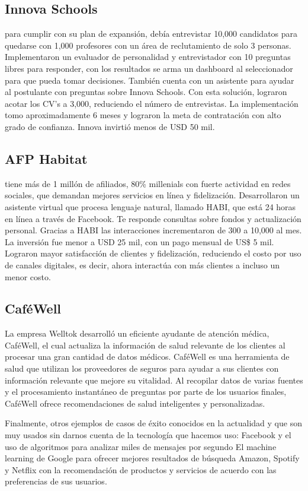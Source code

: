 \subsection{Innova Schools} para cumplir con su plan de expansión, debía entrevistar 10,000 candidatos para quedarse con 1,000 profesores con un área de reclutamiento de solo 3 personas. Implementaron un evaluador de personalidad y entrevistador con 10 preguntas libres para responder, con los resultados se arma un dashboard al seleccionador para que pueda tomar decisiones. También cuenta con un asistente para ayudar al postulante con preguntas sobre Innova Schools. Con esta solución, lograron acotar los CV’s a 3,000, reduciendo el número de entrevistas. La implementación tomo aproximadamente 6 meses y lograron la meta de contratación con alto grado de confianza. Innova invirtió menos de USD 50 mil.

\subsection{AFP Habitat} tiene más de 1 millón de afiliados, 80\% millenials con fuerte actividad en redes sociales, que demandan mejores servicios en línea y fidelización. Desarrollaron un asistente virtual que procesa lenguaje natural, llamado HABI, que está 24 horas en línea a través de Facebook. Te responde consultas sobre fondos y actualización personal. Gracias a HABI las interacciones incrementaron de 300 a 10,000 al mes. La inversión fue menor a USD 25 mil, con un pago mensual de US\$ 5 mil. Lograron mayor satisfacción de clientes y fidelización, reduciendo el costo por uso de canales digitales, es decir, ahora interactúa con más clientes a incluso un menor costo.

\subsection{CaféWell} La empresa Welltok desarrolló un eficiente ayudante de atención médica, CaféWell, el cual actualiza la información de salud relevante de los clientes al procesar una gran cantidad de datos médicos. CaféWell es una herramienta de salud que utilizan los proveedores de seguros para ayudar a sus clientes con información relevante que mejore su vitalidad. Al recopilar datos de varias fuentes y el procesamiento instantáneo de preguntas por parte de los usuarios finales, CaféWell ofrece recomendaciones de salud inteligentes y personalizadas.

Finalmente, otros ejemplos de casos de éxito conocidos en la actualidad y que son muy usados sin darnos cuenta de la tecnología que hacemos uso:
Facebook y el uso de algoritmos para analizar miles de mensajes por segundo
El machine learning de Google para ofrecer mejores resultados de búsqueda
Amazon, Spotify y Netflix con la recomendación de productos y servicios de acuerdo con las preferencias de sus usuarios.


